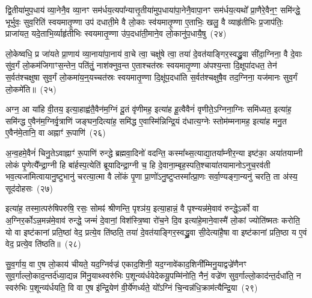 द्वि॒तीया॑मुप॒धाय॑ व्या॒नेनै॒व व्या॒नꣳ सम॑र्धय॒त्यपा᳚न्यात्तृ॒तीया॑मुप॒धाया॑पा॒नेनै॒वापा॒नꣳ सम॑र्धय॒त्यथो᳚ प्रा॒णैरे॒वैन॒ꣳ॒ समि॑न्द्धे॒ भूर्भुवः॒ सुव॒रिति॑ स्वयमातृ॒ण्णा उप॑ दधाती॒मे वै लो॒काः स्व॑यमातृ॒ण्णा ए॒ताभिः॒ खलु॒ वै व्याहृ॑तीभिः प्र॒जाप॑तिः॒ प्राजा॑यत॒ यदे॒ताभि॒र्व्याहृ॑तीभिः स्वयमातृ॒ण्णा उ॑प॒दधा॑ती॒माने॒व लो॒कानु॑प॒धायै॒षु~(२४)

लो॒केष्वधि॒ प्र जा॑यते प्रा॒णाय॑ व्या॒नाया॑पा॒नाय॑ वा॒चे त्वा॒ चक्षु॑षे त्वा॒ तया॑ दे॒वत॑याङ्गिर॒स्वद्ध्रु॒वा सी॑दा॒ग्निना॒ वै दे॒वाः सु॑व॒र्गं लो॒कम॑जिगाꣳस॒न्तेन॒ पति॑तुं॒ नाश॑क्नुव॒न्त ए॒ताश्चत॑स्रः स्वयमातृ॒ण्णा अ॑पश्य॒न्ता दि॒क्षूपा॑दधत॒ तेन॑ स॒र्वत॑श्चक्षुषा सुव॒र्गं लो॒कमा॑य॒न्॒यच्चत॑स्रः स्वयमातृ॒ण्णा दि॒क्षू॑प॒दधा॑ति स॒र्वत॑श्चक्षुषै॒व तद॒ग्निना॒ यज॑मानः सुव॒र्गं लो॒कमे॑ति॥~(२५)

{\anuvakamend[{ब्र॒ह्म॒वा॒दिनो॒ व्य॑न्यादे॒षु यज॑मान॒स्त्रीणि॑ च}]}%

अग्न॒ आ या॑हि वी॒तय॒ इत्या॒हाह्व॑तै॒वैन॑म॒ग्निं दू॒तं वृ॑णीमह॒ इत्या॑ह हू॒त्वैवैनं॑ वृणीते॒\-ऽग्निना॒ग्निः समि॑ध्यत॒ इत्या॑ह॒ समि॑न्द्ध ए॒वैन॑म॒ग्निर्वृ॒त्राणि॑ जङ्घन॒दित्या॑ह॒ समि॑द्ध ए॒वास्मि॑न्निन्द्रि॒यं द॑धात्य॒ग्नेः स्तोम॑म्मनामह॒ इत्या॑ह मनु॒त ए॒वैन॑मे॒तानि॒ वा अह्नाꣳ॑ रू॒पाणि॑~(२६)

अ॒न्व॒हमे॒वैनं॑ चिनु॒ते\-ऽवाह्नाꣳ॑ रू॒पाणि॑ रुन्द्धे ब्रह्मवा॒दिनो॑ वदन्ति॒ कस्मा᳚थ्स॒त्याद्या॒तया᳚म्नीर॒न्या इष्ट॑का॒ अया॑तयाम्नी लोकं पृ॒णेत्यै᳚न्द्रा॒ग्नी हि बा॑र्\mbox{}हस्प॒त्येति॑ ब्रूयादिन्द्रा॒ग्नी च॒ हि दे॒वाना॒म्बृह॒स्पति॒श्चाया॑तयामानो\-ऽनुच॒रव॑ती भव॒त्यजा॑मित्वायानु॒ष्टुभानु॑ चरत्या॒त्मा वै लो॑कं पृ॒णा प्रा॒णो॑\-ऽनु॒ष्टुप्तस्मा᳚त्प्रा॒णः सर्वा॒ण्यङ्गा॒न्यनु॑ चरति॒ ता अ॑स्य॒ सूद॑दोहसः~(२७)

इत्या॑ह॒ तस्मा॒त्परु॑षिपरुषि॒ रसः॒ सोमꣴ॑ श्रीणन्ति॒ पृश्ञ॑य॒ इत्या॒हान्नं॒ वै पृश्न्यन्न॑मे॒वाव॑ रुन्द्धे॒\-ऽर्को वा अ॒ग्निर॒र्को\-ऽन्न॒मन्न॑मे॒वाव॑ रुन्द्धे॒ जन्मं॑ दे॒वानां॒ विश॑स्त्रि॒ष्वा रो॑च॒ने दि॒व इत्या॑हे॒माने॒वास्मै॑ लो॒कां ज्योति॑ष्मतः करोति॒ यो वा इष्ट॑कानां प्रति॒ष्ठां वेद॒ प्रत्ये॒व ति॑ष्ठति॒ तया॑ दे॒वत॑याङ्गिर॒स्वद्ध्रु॒वा सी॒देत्या॑है॒षा वा इष्ट॑कानां प्रति॒ष्ठा य ए॒वं वेद॒ प्रत्ये॒व ति॑ष्ठति॥~(२८)

{\anuvakamend[{रू॒पाणि॒ सूद॑दोहस॒स्तया॒ षोड॑श च}]}%

सु॒व॒र्गाय॒ वा ए॒ष लो॒काय॑ चीयते॒ यद॒ग्निर्वज्र॑ एकाद॒शिनी॒ यद॒ग्नावे॑काद॒शिनी᳚म्मिनु॒याद्वज्रे॑णैनꣳ सुव॒र्गाल्लो॒का\-द॒न्तर्द॑ध्या॒द्यन्न मि॑नु॒याथ्स्वरु॑भिः प॒शून्व्य॑र्धयेदेकयू॒पम्मि॑नोति॒ नैनं॒ वज्रे॑ण सुव॒र्गाल्लो॒काद॑न्त॒र्दधा॑ति॒ न स्वरु॑भिः प॒शून्व्य॑र्धयति॒ वि वा ए॒ष इ॑न्द्रि॒येण॑ वी॒र्ये॑णर्ध्यते॒ यो᳚\-ऽग्निं चि॒न्वन्न॑धि॒क्राम॑त्यैन्द्रि॒या~(२९)

